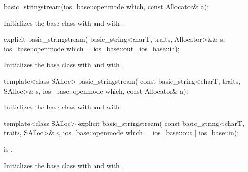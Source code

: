 %
\begin{itemdecl}
basic_stringstream(ios_base::openmode which, const Allocator& a);
\end{itemdecl}

\begin{itemdescr}
\pnum
\effects
Initializes the base class with
and  with
.
\end{itemdescr}

%
\begin{itemdecl}
explicit basic_stringstream(
  basic_string<charT, traits, Allocator>&& s,
  ios_base::openmode which = ios_base::out | ios_base::in);
\end{itemdecl}

\begin{itemdescr}
\pnum
\effects
Initializes the base class with
and  with
.
\end{itemdescr}

%
\begin{itemdecl}
template<class SAlloc>
  basic_stringstream(
    const basic_string<charT, traits, SAlloc>& s,
    ios_base::openmode which, const Allocator& a);
\end{itemdecl}

\begin{itemdescr}
\pnum
\effects
Initializes the base class with
and  with
.
\end{itemdescr}

%
\begin{itemdecl}
template<class SAlloc>
  explicit basic_stringstream(
    const basic_string<charT, traits, SAlloc>& s,
    ios_base::openmode which = ios_base::out | ios_base::in);
\end{itemdecl}

\begin{itemdescr}
\pnum
\constraints
{} is .

\pnum
\effects
Initializes the base class with
and  with
.
\end{itemdescr}


